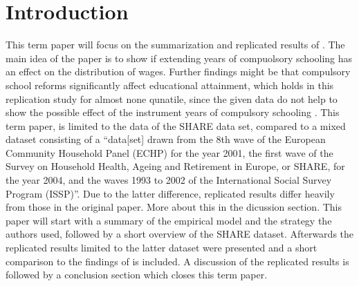 \documentclass[12pt,a4paper]{article}
\begin{document}
\begin{adjustwidth}{1.5em}{0pt}

\begin{acronym}[dummyyyy]


\end{acronym}

\end{adjustwidth}

\restoregeometry

\newpage
{}
\hypertarget{introduction}{%
\section{Introduction}\label{introduction}}

This term paper will focus on the summarization and replicated results
of \textcite{brunello}. The main idea of the paper is to show if
extending years of compuolsory schooling has an effect on the
distribution of wages. Further findings might be that compulsory school
reforms significantly affect educational attainment, which holds in this
replication study for almost none qunatile, since the given data do not
help to show the possible effect of the instrument years of compulsory
schooling . This term paper, is limited to the data of the SHARE data
set, compared to a mixed dataset consisting of a \enquote{data{[}set{]}
drawn from the 8th wave of the European Community Household Panel (ECHP)
for the year 2001, the first wave of the Survey on Household Health,
Ageing and Retirement in Europe, or SHARE, for the year 2004, and the
waves 1993 to 2002 of the International Social Survey Program
(ISSP)}\textcite{brunello}. Due to the latter difference, replicated
results differ heavily from those in the original paper. More about this
in the dicussion section. This paper will start with a summary of the
empirical model and the strategy the authors used, followed by a short
overview of the SHARE dataset. Afterwards the replicated results limited
to the latter dataset were presented and a short comparison to the
findings of \textcite{brunello} is included. A discussion of the
replicated results is followed by a conclusion section which closes this
term paper.
\end{document}
